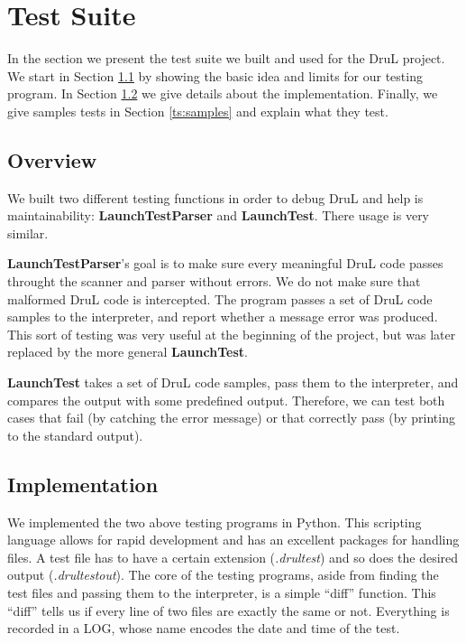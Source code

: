 
\chapter{Test Suite}
In the section we present the test suite we built and used for the DruL 
project. We start in Section \ref{ts:overview} by showing the basic idea
and limits for our testing program. In Section \ref{ts:implem} we give details
about the implementation. Finally, we give samples tests in 
Section \ref{ts:samples} and explain what they test.



\section{Overview} \label{ts:overview}
We built two different testing functions in order to debug DruL and help is
maintainability: \textbf{LaunchTestParser} and \textbf{LaunchTest}. There
usage is very similar.

\textbf{LaunchTestParser}'s goal is to make sure every meaningful DruL code
passes throught the scanner and parser without errors. We do not make sure
that malformed DruL code is intercepted. The program passes a set of DruL code
samples to the interpreter, and report whether a message error was produced.
This sort of testing was very useful at the beginning of the project, but
was later replaced by the more general \textbf{LaunchTest}.

\textbf{LaunchTest} takes a set of DruL code samples, pass them to the
interpreter, and compares the output with some predefined output. Therefore,
we can test both cases that fail (by catching the error message) or that
correctly pass (by printing to the standard output).


\section{Implementation} \label{ts:implem}
We implemented the two above testing programs in Python. This scripting
language allows for rapid development and has an excellent packages for
handling files. A test file has to have a certain extension (\textit{.drultest})
and so does the desired output (\textit{.drultestout}).
The core of the testing programs, aside from finding the test files and passing
them to the interpreter, is a simple ``diff'' function. This ``diff'' tells
us if every line of two files are exactly the same or not.
Everything is recorded in a LOG, whose name encodes the date and time of the test.


